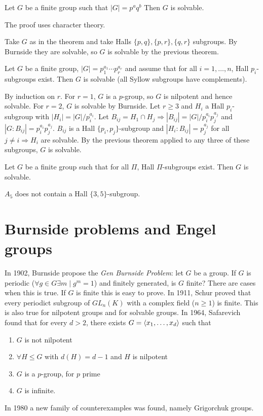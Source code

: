 \documentclass[twoside, 11pt]{article}
\begin{document}
\begin{teorema}[Burnside]
Let $G$ be a finite group such that $|G|=p^aq^b$ Then $G$ is solvable.
\end{teorema}
The proof uses character theory.

\begin{ej}
Take $G$ as in the theorem and take Halls $\{p,q\},\{p,r\},\{q,r\}$ subgroups. By Burnside they are solvable, so $G$ is solvable by the previous theorem.
\end{ej}


\begin{teorema}[Hall]
Let $G$ be a finite group, $|G|=p_1^{a_1}\cdots p_r^{a_r}$ and assume that for all $i=1,\dots, n$, Hall $p_i$-subgroups exist. Then $G$ is solvable (all Syllow subgroups have complements).
\end{teorema}
\begin{dem}
By induction on $r$. For $r=1$, $G$ is a $p$-group, so $G$ is nilpotent and hence solvable. For $r=2$, $G$ is solvable by Burnside. Let $r\geq 3$ and $H_i$ a Hall $p_i$-subgroup with $|H_i|=|G|/p_i^{a_i}$. Let $B_{ij}=H_1\cap H_j\Rightarrow |B_{ij}|=|G|/p_i^{a_i}p_j^{a_j}$ and $|G:B_{ij}|=p_i^{a_i}p_j^{a_j}$. $B_{ij}$ is a Hall $\{p_i,p_j\}$-subgroup and $|H_i:B_{ij}|=p_j^{a_j}$ for all $j\neq i\Rightarrow H_i$ are solvable. By the previous theorem applied to any three of these subgroups, $G$ is solvable. 
\end{dem}
\begin{teorema}
Let $G$ be a finite group such that for all $\Pi$, Hall $\Pi$-subgroups exist. Then $G$ is solvable. 
\end{teorema}
\begin{ej}
$A_5$ does not contain a Hall $\{3,5\}$-subgroup.
\end{ej}



\section{Burnside problems and Engel groups}
In 1902, Burnside propose the \emph{Gen Burnside Problem}: let $G$ be a group. If $G$ is periodic ($\forall g\in G\exists m\mid g^m=1$) and finitely generated, is $G$ finite? There are cases when this is true. If $G$ is finite this is easy to prove. In 1911, Schur proved that every periodict subgroup of $GL_n(K)$ with a complex field ($n\geq 1$) is finite. This is also true for nilpotent groups and for solvable groups. In 1964, Safarevich found that for every $d>2$, there exists $G=\langle{x_1,\dots, x_d}\rangle$ such that \begin{enumerate}
\item $G$ is not nilpotent
\item $\forall H\leq G$ with $d(H)=d-1$ and $H$ is nilpotent
\item $G$ is a $p$-group, for $p$ prime
\item $G$ is infinite.
\end{enumerate}
In 1980 a new family of counterexamples was found, namely Grigorchuk groups. 
\end{document}
